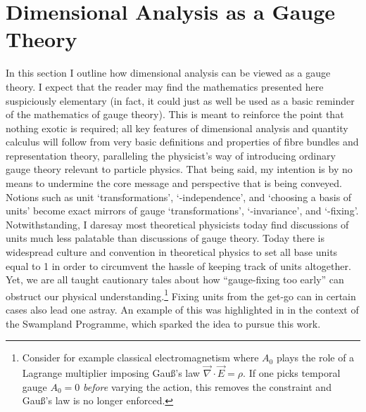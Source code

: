 \documentclass[12pt]{article}
\numberwithin{equation}{section}
\begin{document}
\section{Dimensional Analysis as a Gauge Theory}\label{sec:gaugetheory}
In this section I outline how dimensional analysis can be viewed as a gauge theory. I expect that the reader may find the mathematics presented here suspiciously elementary (in fact, it could just as well be used as a basic reminder of the mathematics of gauge theory). This is meant to reinforce the point that nothing exotic is required; all key features of dimensional analysis and quantity calculus will follow from very basic definitions and properties of fibre bundles and representation theory, paralleling the physicist's way of introducing ordinary gauge theory relevant to particle physics. That being said, my intention is by no means to undermine the core message and perspective that is being conveyed. Notions such as unit `transformations', `\mbox{-independence}', and `choosing a basis of units' become exact mirrors of gauge `transformations', `-invariance', and `-fixing'. Notwithstanding, I daresay most theoretical physicists today find discussions of units much less palatable than discussions of gauge theory. Today there is widespread culture and convention in theoretical physics to set all base units equal to 1 in order to circumvent the hassle of keeping track of units altogether. Yet, we are all taught cautionary tales about how ``gauge-fixing too early'' can obstruct our physical understanding.\footnote{Consider for example classical electromagnetism where $A_0$ plays the role of a Lagrange multiplier imposing Gau\ss's law $\vec{\nabla}\cdot \vec{E} =\rho$. If one picks temporal gauge $A_0=0$ \emph{before} varying the action, this removes the constraint and Gau\ss's law is no longer enforced.} Fixing units from the get-go can in certain cases also lead one astray. An example of this was highlighted in \citet{KaramitsosMuntz2025} in the context of the Swampland Programme, which sparked the idea to pursue this work.
\end{document}
